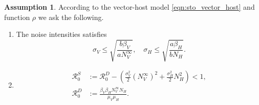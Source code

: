 \documentclass{amsart}
\theoremstyle{plain}
\theoremstyle{definition}
\newtheorem{assumption}{Assumption}
\begin{document}
        \begin{assumption}\label{ass:extintion}
            According to the vector-host model \eqref{eqn:sto_vector_host} and 
            function
            $\rho$
            we ask the following.
            \begin{enumerate}[(E\textendash1)]
                \item \label{ass:noise_condition}
                    The noise intensities satisfies
                    $$
                        \sigma_V \leq 
                            \sqrt{\frac{b \beta_V}{a N_V^{\infty}}},
                         \quad
                        \sigma_H \leq
                            \sqrt{\frac{a \beta_H }{b N_H}}.
                    $$
                \item
                    \begin{equation*}
                        \begin{aligned}
                            \mathcal{R}_0 ^ S &:=
                                \mathcal{R}_0^D - 
                                \left( 
                                    \frac{\sigma_V ^ 2}{2} (N_V ^ {\infty}) ^ 2
                                    +
                                    \frac{\sigma_H ^ 2}{2} N_H ^ 2
                                \right)
                                <1,
                                \\
                            \mathcal{R}_0 ^ D &:=
                                    \frac{\beta_V \beta_H N_V ^ \infty 
                                    N_H}{\mu_V \mu_H} .
                        \end{aligned}
                    \end{equation*}
            \end{enumerate}
        \end{assumption}        
%
%
%
%
\end{document}
